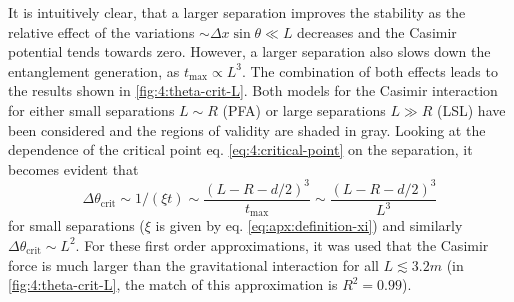 It is intuitively clear, that a larger separation improves the stability as the relative effect of the variations $\sim \Delta x \sin\theta \ll L$ decreases and the Casimir potential tends towards zero.
However, a larger separation also slows down the entanglement generation, as $t_\mathrm{max} \propto L^3$.
The combination of both effects leads to the results shown in \cref{fig:4:theta-crit-L}.
Both models for the Casimir interaction for either small separations $L \sim R$ (PFA) or large separations $L \gg R$ (LSL) have been considered and the regions of validity are shaded in gray.
Looking at the dependence of the critical point eq. \eqref{eq:4:critical-point} on the separation, it becomes evident that
\begin{equation}
  \Delta \theta_\mathrm{crit} \sim 1/(\xi t) \sim \frac{(L - R - d/2)^3}{t_\mathrm{max}} \sim \frac{(L - R - d/2)^3}{L^3}
\end{equation}
for small separations ($\xi$ is given by eq. \eqref{eq:apx:definition-xi}) and similarly $\Delta \theta_\mathrm{crit} \sim L^2$.
For these first order approximations, it was used that the Casimir force is much larger than the gravitational interaction for all $L \lesssim 3.2\si{m}$ (in \cref{fig:4:theta-crit-L}, the match of this approximation is $R^2 = 0.99$).

